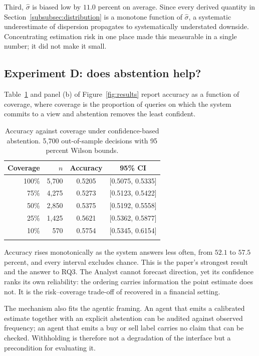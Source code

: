 \documentclass[pdflatex,sn-apa]{sn-jnl}%
\theoremstyle{thmstyleone}%
\theoremstyle{thmstyletwo}%
\theoremstyle{thmstylethree}%
\begin{document}
Third, $\hat{\sigma}$ is biased low by $11.0$ percent on average. Since every
derived quantity in Section~\ref{subsubsec:distribution} is a monotone function
of $\hat{\sigma}$, a systematic underestimate of dispersion propagates to
systematically understated downside. Concentrating estimation risk in one place
made this measurable in a single number; it did not make it small.

\subsection{Experiment D: does abstention help?}\label{subsec:eval-abstention}

Table~\ref{tab:abstain} and panel (b) of Figure~\ref{fig:results} report
accuracy as a function of coverage, where coverage is the proportion of queries
on which the system commits to a view and abstention removes the least
confident.

\begin{table}[h]
\caption{Accuracy against coverage under confidence-based abstention. 5,700
out-of-sample decisions with 95 percent Wilson bounds.}\label{tab:abstain}%
\begin{tabular*}{\textwidth}{@{\extracolsep\fill}rrcc@{}}
\toprule
Coverage & $n$ & Accuracy & 95\% CI \\
\midrule
100\% & 5{,}700 & 0.5205 & [0.5075, 0.5335] \\
75\%  & 4{,}275 & 0.5273 & [0.5123, 0.5422] \\
50\%  & 2{,}850 & 0.5375 & [0.5192, 0.5558] \\
25\%  & 1{,}425 & 0.5621 & [0.5362, 0.5877] \\
10\%  &   570   & 0.5754 & [0.5345, 0.6154] \\
\botrule
\end{tabular*}
\end{table}

Accuracy rises monotonically as the system answers less often, from $52.1$ to
$57.5$ percent, and every interval excludes chance. This is the paper's
strongest result and the answer to RQ3. The Analyst cannot forecast direction,
yet its confidence ranks its own reliability: the ordering carries information
the point estimate does not. It is the risk--coverage trade-off of
\citet{chow1970optimum} recovered in a financial setting.

The mechanism also fits the agentic framing. An agent that emits a calibrated
estimate together with an explicit abstention can be audited against observed
frequency; an agent that emits a buy or sell label carries no claim that can be
checked. Withholding is therefore not a degradation of the interface but a
precondition for evaluating it.
\end{document}
